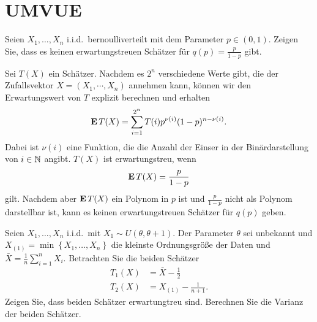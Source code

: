 \section{UMVUE}

Seien $X_1,\ldots,X_n$ i.i.d.\ bernoulliverteilt mit dem Parameter $p \in
(0,1)$. Zeigen Sie, dass es keinen erwartungstreuen Schätzer für $q(p) =
\frac{p}{1-p}$ gibt. 

\solution Sei $T(X)$ ein Schätzer. Nachdem es $2^n$ verschiedene
Werte gibt, die der Zufallsvektor $X = (X_1, \cdots, X_n)$ annehmen kann, können 
wir den Erwartungswert von $T$ explizit berechnen und erhalten
\begin{equation*}
    \mathbf{E} \, T(X) = \sum_{i = 1}^{2^n} T(i) p^{\nu(i)}(1-p)^{n - \nu(i)}.
\end{equation*}
Dabei ist $\nu(i)$ eine Funktion, die die Anzahl der Einser in der
Binärdarstellung von $i\in \mathbb N$ angibt. $T(X)$ ist erwartungstreu, wenn 
\begin{equation*}
    \mathbf{E} \, T(X) = \frac{p}{1-p}
\end{equation*}
gilt. Nachdem aber $\mathbf{E}\, T(X)$ ein Polynom in $p$ ist und $\frac{p}{1-p}$ nicht
als Polynom darstellbar ist, kann es keinen erwartungstreuen Schätzer für
$q(p)$ geben. 


Seien $X_1,\ldots,X_n$ i.i.d.\ mit $X_1\sim U(\theta,\theta+1)$. Der Parameter
$\theta$ sei  unbekannt und $X_{(1)}=\min\left\{ X_1,\ldots,X_n \right\}$ die
kleinste Ordnungsgröße der Daten und $\bar X= \frac{1}{n}\sum_{i=1}^{n}X_i$.
Betrachten Sie die beiden Schätzer 
\begin{align*}
	T_1(X) &= \bar X - \frac{1}{2} \\
	T_2(X) &=  X_{(1)} - \frac{1}{n+1}.
\end{align*}
Zeigen Sie, dass beiden Schätzer erwartungtreu sind. Berechnen Sie 
die Varianz der beiden Schätzer.

